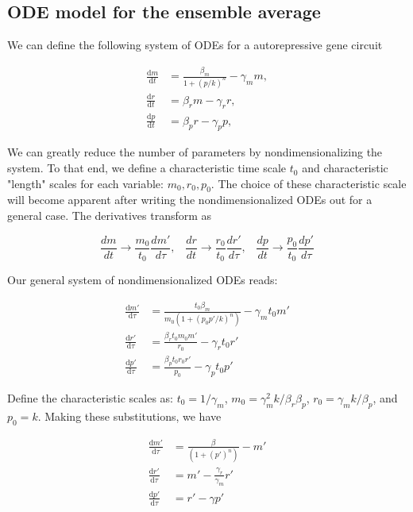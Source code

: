 \documentclass{ucetd}
\begin{document}
\begin{appendices}


\subsection{ODE model for the ensemble average}

We can define the following system of ODEs for a autorepressive gene circuit

\begin{align}
\frac{\mathrm{d}m}{\mathrm{d}t} &= \frac{\beta_{m}}{1 + (p/k)^n} - \gamma_m m,\\[1em]
\frac{\mathrm{d}r}{\mathrm{d}t} &= \beta_{r} m - \gamma_r r,\\[1em]
\frac{\mathrm{d}p}{\mathrm{d}t} &= \beta_{p} r - \gamma_{p} p,
\end{align}

We can greatly reduce the number of parameters by nondimensionalizing the system. To that end, we define a characteristic time scale $t_{0}$ and characteristic "length" scales for each variable: $m_{0}, r_{0}, p_{0}$. The choice of these characteristic scale will become apparent after writing the nondimensionalized ODEs out for a general case. The derivatives transform as

\begin{equation*}
\frac{dm}{dt} \rightarrow \frac{m_{0}}{t_{0}}\frac{dm'}{d\tau}, \;\;\; \frac{dr}{dt} \rightarrow \frac{r_{0}}{t_{0}}\frac{dr'}{d\tau},  \;\;\; \frac{dp}{dt} \rightarrow \frac{p_{0}}{t_{0}}\frac{dp'}{d\tau} 
\end{equation*}

Our general system of nondimensionalized ODEs reads:


\begin{align*}
\frac{\mathrm{d}m'}{\mathrm{d}\tau} &= \frac{t_0\beta_{m}}{m_0(1 + (p_{0}p'/k)^n)} - \gamma_m t_{0}m'\\
\frac{\mathrm{d}r'}{\mathrm{d}\tau} &= \frac{\beta_{r} t_{0}m_{0} m'}{r_0} - \gamma_r t_{0}r'\\
\frac{\mathrm{d}p'}{\mathrm{d}\tau} &= \frac{\beta_{p} t_{0}r_{0} r'}{p_{0}} - \gamma_{p} t_{0} p'
\end{align*}

Define the characteristic scales as: $t_{0} = 1/\gamma_{m}$, $m_{0}=\gamma_{m}^{2}k/\beta_{r}\beta_{p}$, $r_{0} = \gamma_{m}k/\beta_{p}$, and $p_{0} = k$. Making these substitutions, we have

\begin{align*}
\frac{\mathrm{d}m'}{\mathrm{d}\tau} &= \frac{\beta}{(1 + (p')^n)} - m'\\
\frac{\mathrm{d}r'}{\mathrm{d}\tau} &= m' - \frac{\gamma_{r}}{\gamma_{m}}r'\\
\frac{\mathrm{d}p'}{\mathrm{d}\tau} &= r' - \gamma p'
\end{align*}


\end{appendices}
\end{document}
